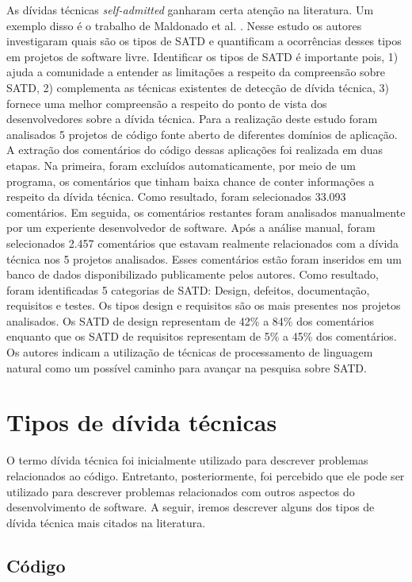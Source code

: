As dívidas técnicas \textit{self-admitted} ganharam certa atenção na literatura. Um exemplo disso é o trabalho de Maldonado et al.  \cite{maldonado2015detecting}. Nesse estudo os autores  investigaram quais são os tipos de SATD e quantificam a ocorrências desses tipos em projetos de software livre. Identificar os tipos de SATD  é importante pois, 1) ajuda a comunidade a entender as limitações a respeito da compreensão sobre SATD, 2) complementa as técnicas existentes de detecção de dívida técnica, 3) fornece uma melhor compreensão a respeito do ponto de vista dos desenvolvedores sobre a dívida técnica. Para a realização deste estudo foram analisados 5 projetos de código fonte aberto de diferentes domínios de aplicação. A extração dos comentários do código dessas aplicações foi realizada em duas etapas. Na primeira, foram excluídos automaticamente, por meio de um programa, os comentários que tinham baixa chance de conter informações a respeito da dívida técnica. Como resultado, foram selecionados 33.093  comentários. Em seguida, os comentários restantes foram analisados manualmente por um experiente desenvolvedor de software.  Após a análise manual, foram selecionados 2.457 comentários que estavam realmente relacionados com a dívida técnica nos 5 projetos analisados. Esses comentários estão foram inseridos em um banco de dados disponibilizado publicamente pelos autores. Como resultado, foram identificadas 5 categorias de SATD: Design, defeitos, documentação, requisitos e testes. Os tipos design e requisitos são os mais presentes nos projetos analisados. Os SATD de design representam de 42\% a 84\% dos comentários enquanto que os SATD de requisitos representam de 5\% a 45\% dos comentários. Os autores indicam a utilização de técnicas de processamento de linguagem natural como um possível caminho para avançar na pesquisa sobre SATD.

\section{Tipos de dívida técnicas}
\label{sec:tipos_td}

O termo dívida técnica foi inicialmente utilizado para descrever problemas relacionados ao código.  Entretanto, posteriormente, foi percebido que ele pode ser utilizado para descrever problemas relacionados com outros aspectos do desenvolvimento de software. A seguir, iremos descrever alguns dos tipos de dívida técnica mais citados na literatura.

\subsection{Código}

